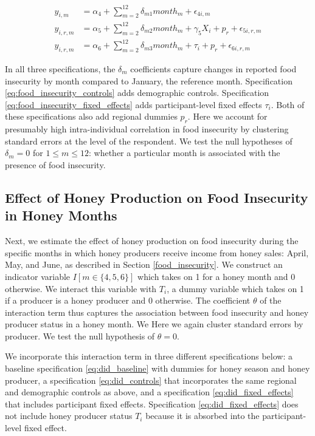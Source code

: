 \documentclass[../main.tex]{subfiles}
\begin{document}
\begin{align}
\label{eq:food_insecurity_baseline}
y_{i,m} &= \alpha_4 + \sum^{12}_{m=2}\delta_{m1}month_m + \epsilon_{4i,m} \\
\label{eq:food_insecurity_controls}
y_{i,r,m} &= \alpha_5 + \sum^{12}_{m=2}\delta_{m2}month_m + \gamma_5 {X}_{i} + p_r + \epsilon_{5i,r,m} \\
\label{eq:food_insecurity_fixed_effects}
y_{i,r,m} &= \alpha_6 + \sum^{12}_{m=2}\delta_{m3}month_m + \tau_{i} + p_r + \epsilon_{6i,r,m} 
\end{align}

In all three specifications, the $\delta_m$ coefficients capture changes in reported food insecurity by month compared to January, the reference month. Specification \eqref{eq:food_insecurity_controls} adds demographic controls. Specification \eqref{eq:food_insecurity_fixed_effects} adds 
participant-level fixed effects $\tau_i$.  
Both of these specifications also add regional dummies $p_r$. Here we account for presumably high intra-individual correlation in food insecurity by clustering standard errors at the level of the respondent. 
We test the null hypotheses of $\delta_{m} = 0$ for $1 \le m \le 12$:
whether a particular month is associated with the presence of food insecurity. 

\subsection{Effect of Honey Production on Food Insecurity in Honey Months}
Next, we estimate the effect of honey production on food insecurity
during the specific months in which honey producers receive income from honey sales: April, May, and June, as described in  
Section \ref{food_insecurity}.  We construct an indicator variable $I[m \in \{4,5,6\}]$ which takes on 1 for a honey month and 0 otherwise. We interact this variable with $T_i$, a dummy variable which takes on 1 if a producer
is a honey producer and 0 otherwise. The coefficient $\theta$ of 
the interaction term thus captures the association between food insecurity and honey producer status in a honey month. We 
Here we again cluster standard errors by producer. We test the null
hypothesis of $\theta = 0$.

We incorporate this interaction term in three different specifications below:
a baseline specification \ref{eq:did_baseline} with dummies for honey season and honey producer,
a specification \ref{eq:did_controls} that incorporates the same
regional and demographic controls as above,
and a specification \ref{eq:did_fixed_effects} that includes participant fixed effects. 
Specification \ref{eq:did_fixed_effects} does not include 
honey producer status $T_i$ because
it is absorbed into the participant-level fixed effect. 
\end{document}

